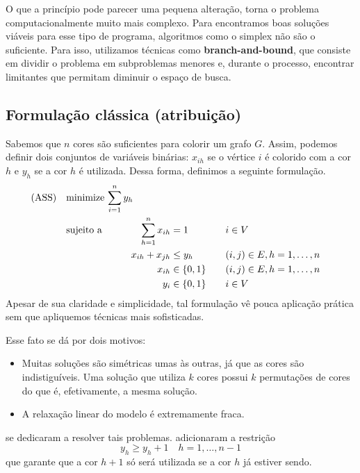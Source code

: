\documentclass[11pt]{article}
\begin{document}
O que a princípio pode parecer uma pequena alteração, torna o problema computacionalmente muito mais complexo.
Para encontramos boas soluções viáveis para esse tipo de programa, algoritmos como o simplex não são o suficiente.
Para isso, utilizamos técnicas como \textbf{branch-and-bound}, que consiste em dividir o problema em subproblemas menores e, durante o processo, encontrar limitantes que permitam diminuir o espaço de busca.

\subsection{Formulação clássica (atribuição)}
\label{sec:org4df510f}
Sabemos que \(n\) cores são suficientes para colorir um grafo \(G\). Assim, podemos definir dois conjuntos de variáveis binárias: \(x_{ih}\) se o vértice \(i\) é colorido com a cor \(h\) e \(y_h\) se a cor \(h\) é utilizada. Dessa forma, definimos a seguinte formulação.
\begin{alignat*}{4}
\mathrm{(ASS)} \quad & \omit\rlap{minimize  $\displaystyle \sum_{i=1}^n y_h$} \\
& \mbox{sujeito a}&& \quad & \sum_{h=1}^n x_{ih}&= 1        & \quad & i \in V \\
&                 &&   & x_{ih} + x_{jh}    & \leq y_h &   & (i,j) \in E, h=1,\dots,n \\
&                 &&   & x_{ih}    & \in \{0,1\} &   & (i,j) \in E, h=1,\dots,n\\
&                 &&   & y_i       & \in \{0,1\} &   & i \in V
\end{alignat*}
Apesar de sua claridade e simplicidade, tal formulação vê pouca aplicação prática sem que apliquemos técnicas mais sofisticadas.

Esse fato se dá por dois motivos:
\begin{itemize}
\item Muitas soluções são simétricas umas às outras, já que as cores são indistiguíveis. Uma solução que utiliza \(k\) cores possui \(k\) permutações de cores do que é, efetivamente, a mesma solução.
\item A relaxação linear do modelo é extremamente fraca.
\end{itemize}

\textcites{MendezDiaz2006BranchCutAlgorithm}[][]{MendezDiaz2008CuttingPlaneAlgorithm} se dedicaram a resolver tais problemas.
\textcite{MendezDiaz2006BranchCutAlgorithm} adicionaram a restrição
\[ y_h \geq y_h+1 \quad h = 1, \dots, n-1 \]
que garante que a cor \(h+1\) só será utilizada se a cor \(h\) já estiver sendo.
\end{document}

